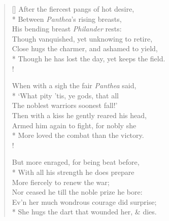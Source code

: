 \documentclass[MAIN]{subfiles}
\begin{document}
\settowidth{\versewidth}{\vin Though he has lost the day, yet keeps the field.}
\begin{verse}[\versewidth]
After the fiercest pangs of hot desire,\\*
\vin Between \emph{Panthea}'s rising breasts,\\
\vin His bending breast \emph{Philander} rests:\\
Though vanquished, yet unknowing to retire,\\
\vin Close hugs the charmer, and ashamed to yield,\\*
\vin Though he has lost the day, yet keeps the field.\\!

When with a sigh the fair \emph{Panthea} said,\\*
\vin `What pity 'tis, ye gods, that all\\
\vin The noblest warriors soonest fall!'\\
Then with a kiss he gently reared his head,\\
\vin Armed him again to fight, for nobly she\\*
\vin More loved the combat than the victory.\\!

But more enraged, for being beat before,\\*
\vin With all his strength he does prepare\\
\vin More fiercely to renew the war;\\
Nor ceased he till the noble prize he bore:\\
\vin Ev'n her much wondrous courage did surprise;\\*
\vin She hugs the dart that wounded her, \& dies.
\end{verse}
\end{document}
